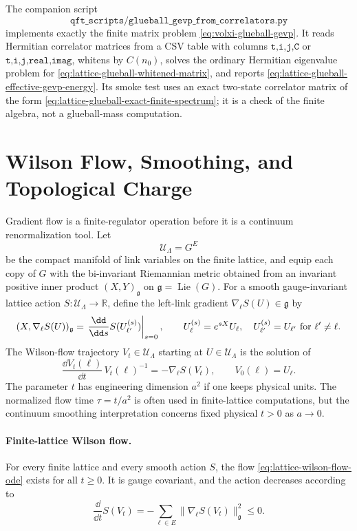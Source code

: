 The companion script
\[
  \texttt{qft\_scripts/glueball\_gevp\_from\_correlators.py}
\]
implements exactly the finite matrix problem
\eqref{eq:volxi-glueball-gevp}.  It reads Hermitian correlator matrices
from a CSV table with columns \(\texttt{t,i,j,C}\) or
\(\texttt{t,i,j,real,imag}\), whitens by \(C(n_0)\), solves the ordinary
Hermitian eigenvalue problem for
\eqref{eq:lattice-glueball-whitened-matrix}, and reports
\eqref{eq:lattice-glueball-effective-gevp-energy}.  Its smoke test uses an
exact two-state correlator matrix of the form
\eqref{eq:lattice-glueball-exact-finite-spectrum}; it is a check of the
finite algebra, not a glueball-mass computation.

\section{Wilson Flow, Smoothing, and Topological Charge}
\label{sec:lattice-wilson-flow-smoothing-topology}

Gradient flow is a finite-regulator operation before it is a continuum
renormalization tool.  Let
\[
  \mathcal U_\Lambda=G^E
\]
be the compact manifold of link variables on the finite lattice, and equip
each copy of \(G\) with the bi-invariant Riemannian metric obtained from an
invariant positive inner product \((X,Y)_{\mathfrak g}\) on
\(\mathfrak g=\operatorname{Lie}(G)\).  For a smooth gauge-invariant lattice
action \(S:\mathcal U_\Lambda\to\mathbb R\), define the left-link gradient
\(\nabla_\ell S(U)\in\mathfrak g\) by
\begin{equation}
  (X,\nabla_\ell S(U))_{\mathfrak g}
  =
  \left.\frac{\dd}{\dd s}
  S(U_{\ell'}^{(s)})\right|_{s=0},
  \qquad
  U_\ell^{(s)}=e^{sX}U_\ell,\quad U_{\ell'}^{(s)}=U_{\ell'}\ {\rm for}\ \ell'\ne\ell .
  \label{eq:lattice-link-gradient-definition}
\end{equation}
The Wilson-flow trajectory \(V_t\in\mathcal U_\Lambda\) starting at
\(U\in\mathcal U_\Lambda\) is the solution of
\begin{equation}
  \frac{\dd V_t(\ell)}{\dd t}\,V_t(\ell)^{-1}
  =
  -\nabla_\ell S(V_t),
  \qquad
  V_0(\ell)=U_\ell .
  \label{eq:lattice-wilson-flow-ode}
\end{equation}
The parameter \(t\) has engineering dimension \(a^2\) if one keeps physical
units.  The normalized flow time \(\tau=t/a^2\) is often used in finite-lattice
computations, but the continuum smoothing interpretation concerns fixed
physical \(t>0\) as \(a\to0\).

\paragraph{Finite-lattice Wilson flow.}
For every finite lattice and every smooth action \(S\), the flow
\eqref{eq:lattice-wilson-flow-ode} exists for all \(t\ge0\).  It is gauge
covariant, and the action decreases according to
\begin{equation}
  \frac{\dd}{\dd t}S(V_t)
  =
  -\sum_{\ell\in E}\|\nabla_\ell S(V_t)\|_{\mathfrak g}^2
  \le0 .
  \label{eq:lattice-wilson-flow-monotonicity}
\end{equation}

